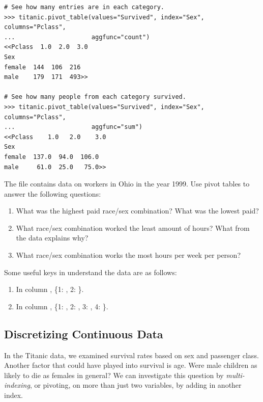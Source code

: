 \begin{lstlisting}
# See how many entries are in each category.
>>> titanic.pivot_table(values="Survived", index="Sex", columns="Pclass",
...                     aggfunc="count")
<<Pclass  1.0  2.0  3.0
Sex
female  144  106  216
male    179  171  493>>

# See how many people from each category survived.
>>> titanic.pivot_table(values="Survived", index="Sex", columns="Pclass",
...                     aggfunc="sum")
<<Pclass    1.0   2.0    3.0
Sex
female  137.0  94.0  106.0
male     61.0  25.0   75.0>>
\end{lstlisting}

\begin{problem}
The file  contains data on workers in Ohio in the year 1999. Use pivot tables to answer the following questions:

\begin{enumerate}
\item What was the highest paid race/sex combination? What was the lowest paid?
\item What race/sex combination worked the least amount of hours? What from the data explains why?
\item What race/sex combination works the most hours per week per person?
\end{enumerate}

Some useful keys in understand the data are as follows:
\begin{enumerate}
\item In column , \{1: , 2: \}.
\item In column , \{1: , 2: , 3: , 4: \}.
\end{enumerate}
\end{problem}

\subsection*{Discretizing Continuous Data} %

In the Titanic data, we examined survival rates based on sex and passenger class.
Another factor that could have played into survival is age.
Were male children as likely to die as females in general?
We can investigate this question by \emph{multi-indexing}, or pivoting, on more than just two variables, by adding in another index.

